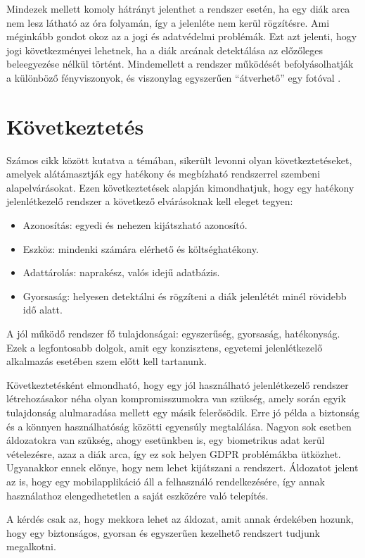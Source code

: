 Mindezek mellett komoly hátrányt jelenthet a rendszer esetén, ha egy diák arca nem lesz látható az óra folyamán, így a jelenléte nem kerül rögzítésre. Ami méginkább gondot okoz az a jogi és adatvédelmi problémák. Ezt azt jelenti, hogy jogi következményei lehetnek, ha a diák arcának detektálása az előzőleges beleegyezése nélkül történt. Mindemellett a rendszer működését befolyásolhatják a különböző fényviszonyok, és viszonylag egyszerűen \enquote{átverhető} egy fotóval \cite{8}.


\section{Következtetés}

Számos cikk között kutatva a témában, sikerült levonni olyan következtetéseket, amelyek alátámasztják egy hatékony és megbízható rendszerrel szembeni alapelvárásokat.
Ezen következtetések alapján kimondhatjuk, hogy egy hatékony jelenlétkezelő rendszer a következő elvárásoknak kell eleget tegyen:
\begin{itemize}
	\item {Azonosítás: egyedi és nehezen kijátszható azonosító.}
	\item {Eszköz: mindenki számára elérhető és költséghatékony.}
	\item {Adattárolás: naprakész, valós idejű adatbázis.}
	\item {Gyorsaság:  helyesen detektálni és rögzíteni a diák jelenlétét minél rövidebb idő alatt.}
\end{itemize}

A jól működő rendszer fő tulajdonságai: egyszerűség, gyorsaság, hatékonyság. Ezek a legfontosabb dolgok, amit egy konzisztens, egyetemi jelenlétkezelő alkalmazás esetében szem előtt kell tartanunk.

Következtetésként elmondható, hogy egy jól használható jelenlétkezelő rendszer létrehozásakor néha olyan kompromisszumokra van szükség, amely során egyik tulajdonság alulmaradása mellett egy másik felerősödik. Erre jó példa a biztonság és a könnyen használhatóság közötti egyensúly megtalálása. Nagyon sok esetben áldozatokra van szükség, ahogy esetünkben is, egy biometrikus adat kerül vételezésre, azaz a diák arca, így ez sok helyen GDPR problémákba ütközhet. Ugyanakkor ennek előnye, hogy nem lehet kijátszani a rendszert. Áldozatot jelent az is, hogy egy mobilapplikáció áll a felhasználó rendelkezésére, így annak használathoz elengedhetetlen a saját eszközére való telepítés.

A kérdés csak az, hogy mekkora lehet az áldozat, amit annak érdekében hozunk, hogy egy biztonságos, gyorsan és egyszerűen kezelhető rendszert tudjunk megalkotni.









